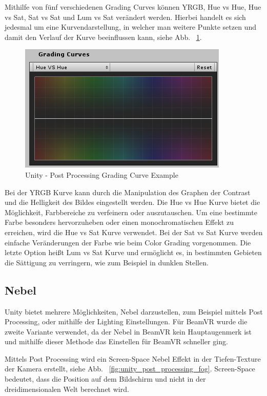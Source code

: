 Mithilfe von fünf verschiedenen Grading Curves können YRGB, Hue vs Hue, Hue vs Sat, Sat vs Sat und Lum vs Sat verändert werden.
Hierbei handelt es sich jedesmal um eine Kurvendarstellung, in welcher man weitere Punkte setzen und damit den Verlauf der Kurve beeinflussen kann, siehe Abb. ~\ref{fig:unity-post-processing-grading-curve-example}.
\begin {figure}
    \centering
    \includegraphics[scale=0.9]{pics/unity-post-processing-grading-curve-example}
    \caption{Unity - Post Processing Grading Curve Example}
    \label{fig:unity-post-processing-grading-curve-example}
\end {figure}
Bei der YRGB Kurve kann durch die Manipulation des Graphen der Contrast und die Helligkeit des Bildes eingestellt werden.
Die Hue vs Hue Kurve bietet die Möglichkeit, Farbbereiche zu verfeinern oder auszutauschen.
Um eine bestimmte Farbe besonders hervorzuheben oder einen monochromatischen Effekt zu erreichen, wird die Hue vs Sat Kurve verwendet.
Bei der Sat vs Sat Kurve werden einfache Veränderungen der Farbe wie beim Color Grading vorgenommen.
Die letzte Option heißt Lum vs Sat Kurve und ermöglicht es, in bestimmten Gebieten die Sättigung zu verringern, wie zum Beispiel in dunklen Stellen.

\subsection{Nebel}\label{subsec:fog-effect}
Unity bietet mehrere M\"oglichkeiten, Nebel darzustellen, zum Beispiel mittels Post Processing, oder mithilfe der Lighting Einstellungen.
F\"ur BeamVR wurde die zweite Variante verwendet, da der Nebel in BeamVR kein Hauptaugenmerk ist und mithilfe dieser Methode das Einstellen für BeamVR schneller ging.
~\cite{Unity_Lighting_Window_2022}

Mittels Post Processing wird ein Screen-Space Nebel Effekt in der Tiefen-Texture der Kamera erstellt, siehe Abb. ~\ref{fig:unity_post_processing_fog}.
Screen-Space bedeutet, dass die Position auf dem Bildschirm und nicht in der dreidimensionalen Welt berechnet wird.
~\cite{Unity_Fog_2022}


